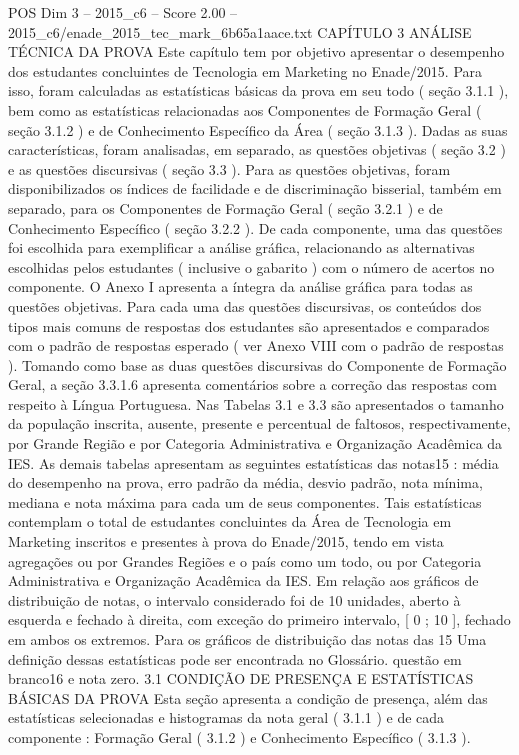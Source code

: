\begin{textsample}{POS Dim 3 – 2015\_c6 – Score 2.00 – 2015\_c6/enade\_2015\_tec\_mark\_6b65a1aace.txt}  \label{ex:f3_pos_214}
CAPÍTULO 3 ANÁLISE TÉCNICA DA PROVA Este capítulo tem por objetivo apresentar o desempenho dos estudantes concluintes de Tecnologia em Marketing no Enade/2015.
Para isso, foram calculadas as estatísticas básicas da prova em seu todo ( seção 3.1.1 ), bem como as estatísticas relacionadas aos Componentes de Formação Geral ( seção 3.1.2 ) e de Conhecimento Específico da Área ( seção 3.1.3 ).
Dadas as suas características, foram analisadas, em separado, as questões objetivas ( seção 3.2 ) e as questões discursivas ( seção 3.3 ).
Para as questões objetivas, foram disponibilizados os índices de facilidade e de discriminação bisserial, também em separado, para os Componentes de Formação Geral ( seção 3.2.1 ) e de Conhecimento Específico ( seção 3.2.2 ).
De cada componente, uma das questões foi escolhida para exemplificar a análise gráfica, relacionando as alternativas escolhidas pelos estudantes ( inclusive o gabarito ) com o número de acertos no componente.
O Anexo I apresenta a íntegra da análise gráfica para todas as questões objetivas.
Para cada uma das questões discursivas, os conteúdos dos tipos mais comuns de respostas dos estudantes são apresentados e comparados com o padrão de respostas esperado ( ver Anexo VIII com o padrão de respostas ).
Tomando como base as duas questões discursivas do Componente de Formação Geral, a seção 3.3.1.6 apresenta comentários sobre a correção das respostas com respeito à Língua Portuguesa.
Nas Tabelas 3.1 e 3.3 são apresentados o tamanho da população inscrita, ausente, presente e percentual de faltosos, respectivamente, por Grande Região e por Categoria Administrativa e Organização Acadêmica da IES.
As demais tabelas apresentam as seguintes estatísticas das notas15 : média do desempenho na prova, erro padrão da média, desvio padrão, nota mínima, mediana e nota máxima para cada um de seus componentes.
Tais estatísticas contemplam o total de estudantes concluintes da Área de Tecnologia em Marketing inscritos e presentes à prova do Enade/2015, tendo em vista agregações ou por Grandes Regiões e o país como um todo, ou por Categoria Administrativa e Organização Acadêmica da IES.
Em relação aos gráficos de distribuição de notas, o intervalo considerado foi de 10 unidades, aberto à esquerda e fechado à direita, com exceção do primeiro intervalo, [ 0 ; 10 ], fechado em ambos os extremos.
Para os gráficos de distribuição das notas das 15 Uma definição dessas estatísticas pode ser encontrada no Glossário. questão em branco16 e nota zero. 3.1 CONDIÇÃO DE PRESENÇA E ESTATÍSTICAS BÁSICAS DA PROVA Esta seção apresenta a condição de presença, além das estatísticas selecionadas e histogramas da nota geral ( 3.1.1 ) e de cada componente : Formação Geral ( 3.1.2 ) e Conhecimento Específico ( 3.1.3 ).

\end{textsample}
